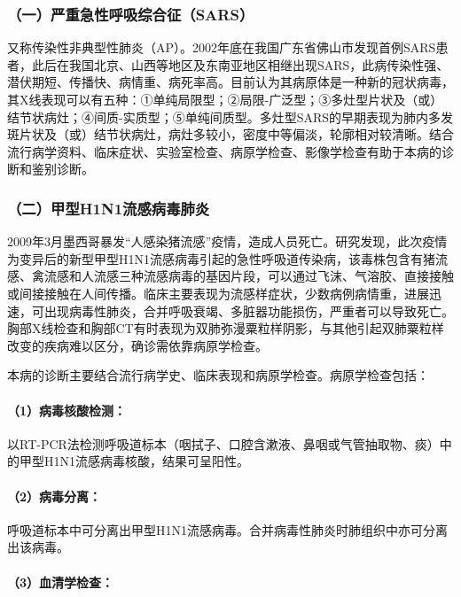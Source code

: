 \subsubsection{（一）严重急性呼吸综合征（SARS）}

又称传染性非典型性肺炎（AP）。2002年底在我国广东省佛山市发现首例SARS患者，此后在我国北京、山西等地区及东南亚地区相继出现SARS，此病传染性强、潜伏期短、传播快、病情重、病死率高。目前认为其病原体是一种新的冠状病毒，其X线表现可以有五种：①单纯局限型；②局限-广泛型；③多灶型片状及（或）结节状病灶；④间质-实质型；⑤单纯间质型。多灶型SARS的早期表现为肺内多发斑片状及（或）结节状病灶，病灶多较小，密度中等偏淡，轮廓相对较清晰。结合流行病学资料、临床症状、实验室检查、病原学检查、影像学检查有助于本病的诊断和鉴别诊断。

\subsubsection{（二）甲型H1N1流感病毒肺炎}

2009年3月墨西哥暴发“人感染猪流感”疫情，造成人员死亡。研究发现，此次疫情为变异后的新型甲型H1N1流感病毒引起的急性呼吸道传染病，该毒株包含有猪流感、禽流感和人流感三种流感病毒的基因片段，可以通过飞沫、气溶胶、直接接触或间接接触在人间传播。临床主要表现为流感样症状，少数病例病情重，进展迅速，可出现病毒性肺炎，合并呼吸衰竭、多脏器功能损伤，严重者可以导致死亡。胸部X线检查和胸部CT有时表现为双肺弥漫粟粒样阴影，与其他引起双肺粟粒样改变的疾病难以区分，确诊需依靠病原学检查。

本病的诊断主要结合流行病学史、临床表现和病原学检查。病原学检查包括：

\paragraph{（1）病毒核酸检测：}

以RT-PCR法检测呼吸道标本（咽拭子、口腔含漱液、鼻咽或气管抽取物、痰）中的甲型H1N1流感病毒核酸，结果可呈阳性。

\paragraph{（2）病毒分离：}

呼吸道标本中可分离出甲型H1N1流感病毒。合并病毒性肺炎时肺组织中亦可分离出该病毒。

\paragraph{（3）血清学检查：}

